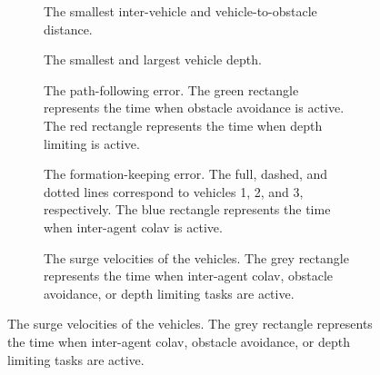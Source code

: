 \begin{figure}[p]
    \centering
    \begin{subfigure}[t]{0.475\textwidth}
        \centering
        
        \vspace{-4mm}
        \caption{The smallest inter-vehicle and vehicle-to-obstacle distance.}
        \label{fig:NSB_R_distances}
        \vspace{-1mm}
    \end{subfigure}
    \hspace{1em}
    \begin{subfigure}[t]{0.475\textwidth}
        \centering
        \hspace*{-1em}
        
        \vspace{-4mm}
        \caption{The smallest and largest vehicle depth.}
        \label{fig:NSB_R_depth}
        \vspace{-1mm}
    \end{subfigure}
    \begin{subfigure}[t]{0.475\textwidth}
        \centering
        
        \vspace{-4mm}
        \caption{The path-following error. The green rectangle represents the time when obstacle avoidance is active. The red rectangle represents the time when depth limiting is active.}
        \label{fig:NSB_R_path_following_error}
        \vspace{-1mm}
    \end{subfigure}
    \hspace{1em}
    \begin{subfigure}[t]{0.475\textwidth}
        \centering
        \hspace*{-1.1em}
        
        \vspace{-4mm}
        \caption{The formation-keeping error. The full, dashed, and dotted lines correspond to vehicles 1, 2, and 3, respectively. The blue rectangle represents the time when inter-agent \gls{colav} is active.}
        \label{fig:NSB_R_formation_keeping_error}
        \vspace{-1mm}
    \end{subfigure}
    \begin{subfigure}[t]{0.475\textwidth}
        \centering
        
        \vspace{-4mm}
        \caption{The surge velocities of the vehicles. The grey rectangle represents the time when inter-agent \gls{colav}, obstacle avoidance, or depth limiting tasks are active.}

\end{subfigure}
\end{figure}
